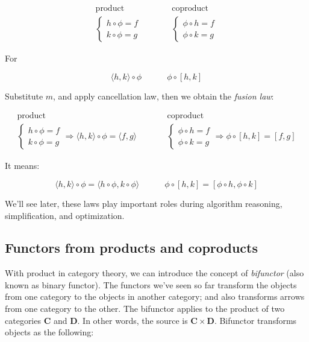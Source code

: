 \documentclass{article}
\begin{document}
\[
\begin{array}{ccc}
  \text{product} & & \text{coproduct} \\
  \begin{cases}
  h \circ \phi = f \\
  k \circ \phi = g
  \end{cases}
  & \quad \quad &
  \begin{cases}
  \phi \circ h = f \\
  \phi \circ k = g
  \end{cases}
\end{array}
\]

For

\[
\langle h, k \rangle \circ \phi \quad \quad \quad \phi \circ [h, k]
\]

Substitute $m$, and apply cancellation law, then we obtain the {\em fusion law}:

\[
\begin{array}{ccc}
  \text{product} & & \text{coproduct} \\
  \begin{cases}
  h \circ \phi = f \\
  k \circ \phi = g
  \end{cases} \Rightarrow
    \langle h, k \rangle \circ \phi = \langle f, g \rangle
  & \quad \quad &
  \begin{cases}
  \phi \circ h = f \\
  \phi \circ k = g
  \end{cases} \Rightarrow
    \phi \circ [h, k] = [f, g]
\end{array}
\]

It means:

\[
\langle h, k \rangle \circ \phi = \langle h \circ \phi, k \circ \phi \rangle
\quad \quad \quad
\phi \circ [h, k] = [\phi \circ h, \phi \circ k]
\]

We'll see later, these laws play important roles during algorithm reasoning, simplification, and optimization.

\subsection{Functors from products and coproducts}
 
With product in category theory, we can introduce the concept of {\em bifunctor} (also known as binary functor). The functors we've seen so far transform the objects from one category to the objects in another category; and also transforms arrows from one category to the other. The bifunctor applies to the product of two categories $\pmb{C}$ and $\pmb{D}$. In other words, the source is $\pmb{C} \times \pmb{D}$. Bifunctor transforms objects as the following:
\end{document}
